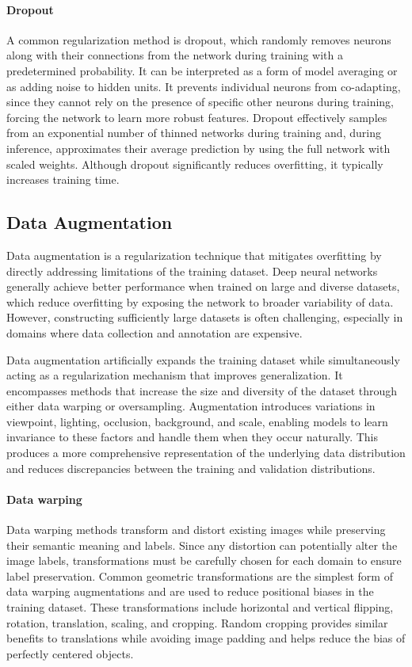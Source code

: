 \paragraph{Dropout} A common regularization method is dropout, which randomly removes neurons along with their connections from the network during training with a predetermined probability. It can be interpreted as a form of model averaging or as adding noise to hidden units. It prevents individual neurons from co-adapting, since they cannot rely on the presence of specific other neurons during training, forcing the network to learn more robust features. Dropout effectively samples from an exponential number of thinned networks during training and, during inference, approximates their average prediction by using the full network with scaled weights. Although dropout significantly reduces overfitting, it typically increases training time.~\cite{Krizhevsky2012, Srivastava2014}

\subsection{Data Augmentation}
Data augmentation is a regularization technique that mitigates overfitting by directly addressing limitations of the training dataset. Deep neural networks generally achieve better performance when trained on large and diverse datasets, which reduce overfitting by exposing the network to broader variability of data. However, constructing sufficiently large datasets is often challenging, especially in domains where data collection and annotation are expensive.

Data augmentation artificially expands the training dataset while simultaneously acting as a regularization mechanism that improves generalization. It encompasses methods that increase the size and diversity of the dataset through either data warping or oversampling. Augmentation introduces variations in viewpoint, lighting, occlusion, background, and scale, enabling models to learn invariance to these factors and handle them when they occur naturally. This produces a more comprehensive representation of the underlying data distribution and reduces discrepancies between the training and validation distributions.~\cite{Shorten2019, Yang2023}

\paragraph{Data warping} Data warping methods transform and distort existing images while preserving their semantic meaning and labels. Since any distortion can potentially alter the image labels, transformations must be carefully chosen for each domain to ensure label preservation. Common geometric transformations are the simplest form of data warping augmentations and are used to reduce positional biases in the training dataset. These transformations include horizontal and vertical flipping, rotation, translation, scaling, and cropping. Random cropping provides similar benefits to translations while avoiding image padding and helps reduce the bias of perfectly centered objects.


